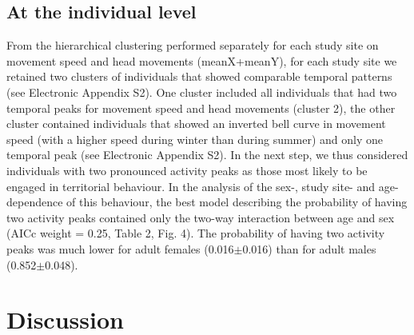 \documentclass[a4paper,11pt]{article}
\begin{document}
\subsection*{At the individual level}
From the hierarchical clustering performed separately for each study
site on movement speed and head movements (meanX+meanY), for each
study site we retained two clusters of individuals that showed
comparable temporal patterns (see Electronic Appendix S2). One cluster
included all individuals that had two temporal peaks for movement
speed and head movements (cluster 2), the other cluster contained
individuals that showed an inverted bell curve in movement speed (with
a higher speed during winter than during summer) and only one temporal
peak (see Electronic Appendix S2). In the next step, we thus
considered individuals with two pronounced activity peaks as those
most likely to be engaged in territorial behaviour. In the analysis of
the sex-, study site- and age- dependence of this behaviour, the best
model describing the probability of having two activity peaks
contained only the two-way interaction between age and sex (AICc
weight = 0.25, Table 2, Fig. 4). The probability of having two
activity peaks was much lower for adult females (0.016$\pm$0.016) than for
adult males (0.852$\pm$0.048).

\section*{Discussion}


\end{document}
